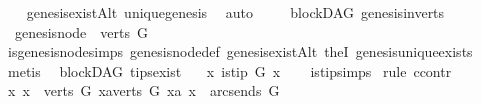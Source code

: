 \begin{isabellebody}
%
\isadelimproof
\ \ %
\endisadelimproof
%
\isatagproof
{}\isamarkupfalse%
\ genesis{\isacharunderscore}{\kern0pt}existAlt\ unique{\isacharunderscore}{\kern0pt}genesis\ \isamarkupfalse%
\ auto%
\endisatagproof
{\isafoldproof}%
%
\isadelimproof
\ \ \isanewline
%
\endisadelimproof
\isanewline
{}\isamarkupfalse%
\ {\isacharparenleft}{\kern0pt}\ blockDAG{\isacharparenright}{\kern0pt}\ genesis{\isacharunderscore}{\kern0pt}in{\isacharunderscore}{\kern0pt}verts{\isacharcolon}{\kern0pt}\isanewline
\ \ {\isachardoublequoteopen}genesis{\isacharunderscore}{\kern0pt}node\ {\isasymin}\ verts\ G{\isachardoublequoteclose}\isanewline
%
\isadelimproof
\ \ %
\endisadelimproof
%
\isatagproof
{}\isamarkupfalse%
\ is{\isacharunderscore}{\kern0pt}genesis{\isacharunderscore}{\kern0pt}node{\isachardot}{\kern0pt}simps\ genesis{\isacharunderscore}{\kern0pt}node{\isacharunderscore}{\kern0pt}def\ genesis{\isacharunderscore}{\kern0pt}existAlt\ the{}I{}\ genesis{\isacharunderscore}{\kern0pt}unique{\isacharunderscore}{\kern0pt}exists\isanewline
\ \ \isamarkupfalse%
\ metis%
\endisatagproof
{\isafoldproof}%
%
\isadelimproof
%
\endisadelimproof
%
\isadelimdocument
%
\endisadelimdocument
%
\isatagdocument
%
\isamarkuptrue%
%
\endisatagdocument
{\isafolddocument}%
%
\isadelimdocument
%
\endisadelimdocument
{}\isamarkupfalse%
\ {\isacharparenleft}{\kern0pt}\ blockDAG{\isacharparenright}{\kern0pt}\ tips{\isacharunderscore}{\kern0pt}exist{\isacharcolon}{\kern0pt}\ \isanewline
\ \ {\isachardoublequoteopen}{\isasymexists}x{\isachardot}{\kern0pt}\ is{\isacharunderscore}{\kern0pt}tip\ G\ x{\isachardoublequoteclose}\isanewline
%
\isadelimproof
\ \ %
\endisadelimproof
%
\isatagproof
{}\isamarkupfalse%
\ is{\isacharunderscore}{\kern0pt}tip{\isachardot}{\kern0pt}simps\isanewline
{}\isamarkupfalse%
\ {\isacharparenleft}{\kern0pt}rule\ ccontr{\isacharparenright}{\kern0pt}\isanewline
\ \ \isamarkupfalse%
\ {\isachardoublequoteopen}{\isasymnexists}x{\isachardot}{\kern0pt}\ x\ {\isasymin}\ verts\ G\ {\isasymand}{\isacharparenleft}{\kern0pt}{\isasymforall}xa{\isasymin}verts\ G{\isachardot}{\kern0pt}\ {\isacharparenleft}{\kern0pt}xa{\isacharcomma}{\kern0pt}\ x{\isacharparenright}{\kern0pt}\ {\isasymnotin}\ {\isacharparenleft}{\kern0pt}arcs{\isacharunderscore}{\kern0pt}ends\ G{\isacharparenright}{\kern0pt}\isactrlsup {\isacharplus}{\kern0pt}{\isacharparenright}{\kern0pt}{\isachardoublequoteclose}\isanewline

\end{isabellebody}
